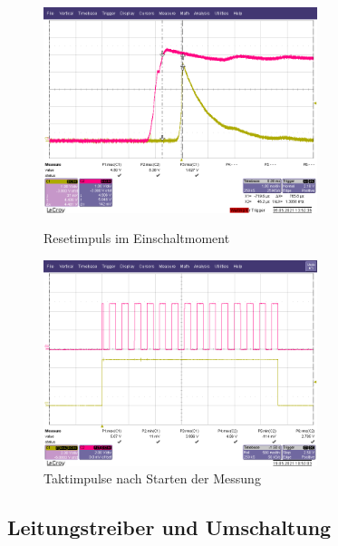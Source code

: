\begin{figure}[htb]
    \centering
    \begin{minipage}[t]{0.45\linewidth}
        \centering
        \includegraphics[width=8cm]{Bilder/Resetimpuls.png}
        \caption{Resetimpuls im Einschaltmoment}
    \end{minipage}%
    \hfill
    \begin{minipage}[t]{0.45\linewidth}
        \centering
        \includegraphics[width=8cm]{Bilder/4Bittakt.png}
        \caption{Taktimpulse nach Starten der Messung}
    \end{minipage} 
\end{figure}


\newpage
\subsection{Leitungstreiber und Umschaltung}


